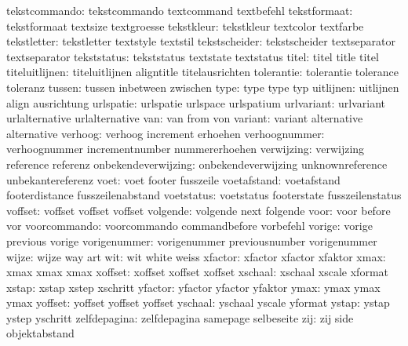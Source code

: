        tekstcommando:  tekstcommando        textcommand          textbefehl
        tekstformaat:  tekstformaat         textsize             textgroesse
          tekstkleur:  tekstkleur           textcolor            textfarbe
         tekstletter:  tekstletter          textstyle            textstil
       tekstscheider:  tekstscheider        textseparator        textseparator
         tekststatus:  tekststatus          textstate            textstatus
               titel:  titel                title                titel
      titeluitlijnen:  titeluitlijnen       aligntitle           titelausrichten
          tolerantie:  tolerantie           tolerance            toleranz
              tussen:  tussen               inbetween            zwischen
                type:  type                 type                 typ
           uitlijnen:  uitlijnen            align                ausrichtung
           urlspatie:  urlspatie            urlspace             urlspatium
          urlvariant:  urlvariant           urlalternative       urlalternative
                 van:  van                  from                 von
             variant:  variant              alternative          alternative
             verhoog:  verhoog              increment            erhoehen
       verhoognummer:  verhoognummer        incrementnumber      nummererhoehen
          verwijzing:  verwijzing           reference            referenz
 onbekendeverwijzing:  onbekendeverwijzing  unknownreference     unbekantereferenz
                voet:  voet                 footer               fusszeile
         voetafstand:  voetafstand          footerdistance       fusszeilenabstand
          voetstatus:  voetstatus           footerstate          fusszeilenstatus
             voffset:  voffset              voffset              voffset
            volgende:  volgende             next                 folgende
                voor:  voor                 before               vor
        voorcommando:  voorcommando         commandbefore        vorbefehl
              vorige:  vorige               previous             vorige
        vorigenummer:  vorigenummer         previousnumber       vorigenummer
               wijze:  wijze                way                  art
                 wit:  wit                  white                weiss
             xfactor:  xfactor              xfactor              xfaktor
                xmax:  xmax                 xmax                 xmax
             xoffset:  xoffset              xoffset              xoffset
             xschaal:  xschaal              xscale               xformat
               xstap:  xstap                xstep                xschritt
             yfactor:  yfactor              yfactor              yfaktor
                ymax:  ymax                 ymax                 ymax
             yoffset:  yoffset              yoffset              yoffset
             yschaal:  yschaal              yscale               yformat
               ystap:  ystap                ystep                yschritt
        zelfdepagina:  zelfdepagina         samepage             selbeseite
                 zij:  zij                  side                 objektabstand

